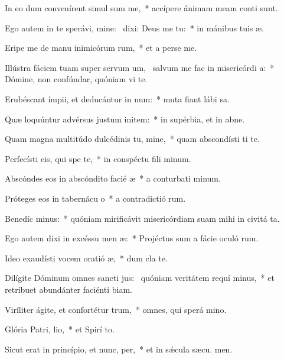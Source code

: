 \item In eo dum convenírent simul sum me,~* accípere ánimam meam conti sunt.
\item Ego autem in te sperávi, mine:~\pscross{} dixi: Deus me  tu:~* in mánibus tuis  æ.
\item Eripe me de manu inimicórum rum,~* et a perse me.
\item Illústra fáciem tuam super servum um,~\pscross{} salvum me fac in misericórdi a:~* Dómine, non confúndar, quóniam vi te.
\item Erubéscant ímpii, et deducántur in num:~* muta fiant lábi sa.
\item Quæ loquúntur advérsus justum initem:~* in supérbia, et in abne.
\item Quam magna multitúdo dulcédinis tu, mine,~* quam abscondísti ti te.
\item Perfecísti eis, qui spe  te,~* in conspéctu fili minum.
\item Abscóndes eos in abscóndito facié æ~* a conturbati minum.
\item Próteges eos in tabernácu o~* a contradictió rum.
\item Benedíc minus:~* quóniam mirificávit misericórdiam suam mihi in civitá ta.
\item Ego autem dixi in excéssu men æ:~* Projéctus sum a fácie oculó rum.
\item Ideo exaudísti vocem oratió æ,~* dum cla  te.
\item Dilígite Dóminum omnes sancti jus:~\pscross{} quóniam veritátem requí minus,~* et retríbuet abundánter faciénti biam.
\item Viríliter ágite, et confortétur  trum,~* omnes, qui sperá  mino.
\item Glória Patri,  lio,~* et Spirí to.
\item Sicut erat in princípio, et nunc,  per,~* et in sǽcula sæcu. men.
